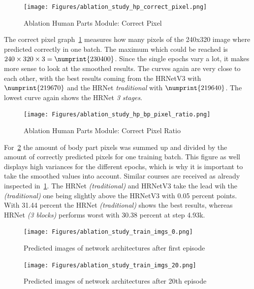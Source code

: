 \begin{figure}[H]
    \centering
    \texttt{[image: Figures/ablation\_study\_hp\_correct\_pixel.png]}
    \decoRule
    \caption[Ablation Human Parts Module: Correct Pixel]{Ablation Human Parts Module: Correct Pixel}
    \label{fig:ablation-correct-px}
\end{figure}

The correct pixel graph~\ref{fig:ablation-correct-px} measures how many pixels of the 240x320 image where predicted correctly
in one batch. The maximum which could be reached is $240\times320\times3=\numprint{230400}$.
Since the single epochs vary a lot, it makes more sense to look at the smoothed results.
The curves again are very close to each other, with the best results coming from the HRNetV3 with $\numprint{219670}$ and
the HRNet \textit{traditional} with $\numprint{219640}$.
The lowest curve again shows the HRNet \textit{3 stages}.

\begin{figure}[H]
    \centering
    \texttt{[image: Figures/ablation\_study\_hp\_bp\_pixel\_ratio.png]}
    \decoRule
    \caption[Ablation Human Parts Module: Correctness Ratio]{Ablation Human Parts Module: Correct Pixel Ratio}
    \label{fig:correct-pixel-ratio}
\end{figure}

For~\ref{fig:correct-pixel-ratio} the amount of body part pixels was summed up and divided by the amount of correctly
predicted pixels for one training batch.
This figure as well displays high variances for the different epochs, which is why it is important to take the smoothed
values into account. Similar courses are received as already inspected in~\ref{fig:ablation-correct-px}.
The HRNet \textit{(traditional)} and HRNetV3 take the lead wih the \textit{(traditional)} one being slightly above the HRNetV3
with 0.05 percent points. With 31.44 percent the HRNet \textit{(traditional)} shows the best results, whereas HRNet
\textit{(3 blocks)} performs worst with 30.38 percent at step 4.93k.

\begin{figure}[H]
    \centering
    \texttt{[image: Figures/ablation\_study\_train\_imgs\_0.png]}
    \decoRule
    \caption[Ablation Human Parts Module: 1st Episode Predictions]{Predicted images of network architectures after first
    episode}
    \label{fig:train-img-0}
\end{figure}
\begin{figure}[H]
    \centering
    \texttt{[image: Figures/ablation\_study\_train\_imgs\_20.png]}
    \decoRule
    \caption[Ablation Human Parts Module: 20th Episode Predictions]{Predicted images of network architectures after 20th
    episode}
    \label{fig:train-img-20}
\end{figure}


